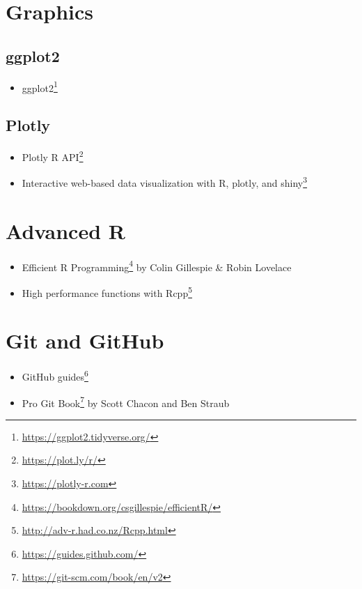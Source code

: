 \documentclass[
]{book}
\DeclareRobustCommand{\href}[2]{#2\footnote{\url{#1}}}
\providecommand{\tightlist}{%
  \setlength{\itemsep}{0pt}\setlength{\parskip}{0pt}}
\renewcommand{\href}[2]{#2\footnote{\url{#1}}}
\begin{document}
\hypertarget{graphics}{%
\section{Graphics}\label{graphics}}

\hypertarget{ggplot2-8}{%
\subsection{ggplot2}\label{ggplot2-8}}

\begin{itemize}
\tightlist
\item
  \href{https://ggplot2.tidyverse.org/}{ggplot2}
\end{itemize}

\hypertarget{plotly-2}{%
\subsection{Plotly}\label{plotly-2}}

\begin{itemize}
\tightlist
\item
  \href{https://plot.ly/r/}{Plotly R API}
\item
  \href{https://plotly-r.com}{Interactive web-based data visualization with R, plotly, and shiny}
\end{itemize}

\hypertarget{advanced-r}{%
\section{Advanced R}\label{advanced-r}}

\begin{itemize}
\tightlist
\item
  \href{https://bookdown.org/csgillespie/efficientR/}{Efficient R Programming} by Colin Gillespie \& Robin Lovelace
\item
  \href{http://adv-r.had.co.nz/Rcpp.html}{High performance functions with Rcpp}
\end{itemize}

\hypertarget{git-and-github}{%
\section{Git and GitHub}\label{git-and-github}}

\begin{itemize}
\tightlist
\item
  \href{https://guides.github.com/}{GitHub guides}
\item
  \href{https://git-scm.com/book/en/v2}{Pro Git Book} by Scott Chacon and Ben Straub
\end{itemize}
\end{document}
